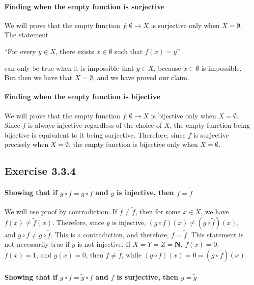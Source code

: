 \documentclass[12pt, oneside]{book}
\begin{document}
	\paragraph*{Finding when the empty function is surjective}
	
	We will prove that the empty function $f \colon \emptyset \rightarrow X$ is surjective only when $X = \emptyset$. The statement
	\begin{center}
		``For every $y \in X$, there exists $x \in \emptyset$ such that $f(x) = y$''
	\end{center}
	can only be true when it is impossible that $y \in X$, because $x \in \emptyset$ is impossible. But then we have that $X = \emptyset$, and we have proved our claim.
	
	\paragraph*{Finding when the empty function is bijective}
	
	We will prove that the empty function $f \colon \emptyset \rightarrow X$ is bijective only when $X = \emptyset$. Since $f$ is always injective regardless of the choice of $X$, the empty function being bijective is equivalent to it being surjective. Therefore, since $f$ is surjective precisely when $X = \emptyset$, the empty function is bijective only when $X = \emptyset$.
	
	\subsection*{Exercise 3.3.4}
	
	\paragraph*{Showing that if $g \circ f = g \circ \tilde{f}$ and $g$ is injective, then $f = \tilde{f}$}
	
	We will use proof by contradiction. If $f \ne \tilde{f}$, then for some $x \in X$, we have $f(x) \ne \tilde{f}(x)$. Therefore, since $g$ is injective, $(g \circ f)(x) \ne (g \circ \tilde{f})(x)$, and $g \circ f \ne g \circ \tilde{f}$. This is a contradiction, and therefore, $f = \tilde{f}$. This statement is not necessarily true if $g$ is not injective. If $X = Y = Z = \mathbf{N}$, $f(x) = 0$, $\tilde{f}(x) = 1$, and $g(x) = 0$, then $f \ne \tilde{f}$, while $(g \circ f)(x) = 0 = (g \circ \tilde{f})(x)$.
	
	\paragraph*{Showing that if $g \circ f = \tilde{g} \circ f$ and $f$ is surjective, then $g = \tilde{g}$}
	
\end{document}
